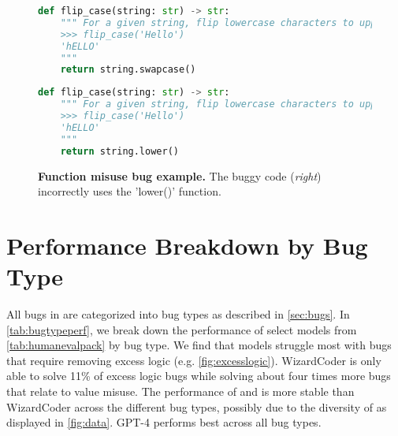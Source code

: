 \begin{figure}[htbp]
\centering
\begin{minipage}{0.45\textwidth}
\begin{lstlisting}[language=Python,breaklines=true,basicstyle=\ttfamily\scriptsize]
def flip_case(string: str) -> str:
    """ For a given string, flip lowercase characters to uppercase and uppercase to lowercase.
    >>> flip_case('Hello')
    'hELLO'
    """
    return string.swapcase()    
\end{lstlisting}
\end{minipage}\hfill
\begin{minipage}{0.45\textwidth}
\begin{lstlisting}[language=Python,breaklines=true,basicstyle=\ttfamily\scriptsize]
def flip_case(string: str) -> str:
    """ For a given string, flip lowercase characters to uppercase and uppercase to lowercase.
    >>> flip_case('Hello')
    'hELLO'
    """
    return string.lower()    
\end{lstlisting}
\end{minipage}
\caption{\textbf{Function misuse bug example.} The buggy code (\emph{right}) incorrectly uses the 'lower()' function.}
\label{fig:functionmisuse}
\end{figure}

\FloatBarrier


\section{Performance Breakdown by \evalf{} Bug Type}
\label{sec:modelbugs}

All bugs in \evalf{} are categorized into bug types as described in \autoref{sec:bugs}. In \autoref{tab:bugtypeperf}, we break down the \evalf{} performance of select models from \autoref{tab:humanevalpack} by bug type. We find that models struggle most with bugs that require removing excess logic (e.g. \autoref{fig:excesslogic}). WizardCoder is only able to solve 11\% of excess logic bugs while solving about four times more bugs that relate to value misuse. The performance of \modelx{} and \model{} is more stable than WizardCoder across the different bug types, possibly due to the diversity of \dataft{} as displayed in \autoref{fig:data}. GPT-4 performs best across all bug types.


